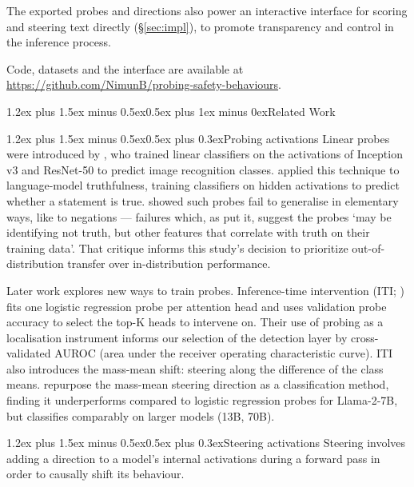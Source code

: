 \documentclass[conference]{IEEEtran}
\makeatletter
\renewcommand{\section}{\@startsection{section}{1}{\z@}%
  {1.2ex plus 1.5ex minus 0.5ex}{0.5ex plus 1ex minus 0ex}{\normalfont\normalsize\centering\scshape}}
\renewcommand{\paragraph}{\@startsection{paragraph}{4}{2em}%
  {1.2ex plus 1.5ex minus 0.5ex}{0.5ex plus 0.3ex}{\normalfont\normalsize\itshape}}
\makeatother
\begin{document}
The exported probes and directions also power an interactive interface for
scoring and steering text directly (\S\ref{sec:impl}), to promote transparency and 
control in the inference process.

Code, datasets and
the interface are available at
\url{https://github.com/NimunB/probing-safety-behaviours}.

\section{Related Work}
\label{sec:related}

\paragraph{Probing activations}
Linear probes were introduced by \citet{alain2018}, who trained linear
classifiers on the activations of Inception v3 and ResNet-50 to predict
image recognition classes. 
\citet{azaria2023} applied this technique to language-model
truthfulness, training classifiers on hidden activations to predict whether a
statement is true. \citet{levinstein2024} showed such probes fail to
generalise in elementary ways, like to negations --- failures which,
as \citet[§1]{marks2024} put it, suggest the probes `may be identifying not truth,
but other features that correlate with truth on their training data'. That
critique informs this study's decision to prioritize out-of-distribution transfer over in-distribution
performance.

Later work explores new ways to train probes. Inference-time intervention (ITI;
\citealt{li2023}) fits one logistic regression probe per attention head and uses validation
probe accuracy to select the top-K heads to intervene on. Their use of probing
as a localisation instrument informs our selection of the detection layer by
cross-validated AUROC (area under the
receiver operating characteristic curve). ITI also introduces the mass-mean shift: steering along the
difference of the class means. \citet{marks2024} repurpose the mass-mean steering direction as a classification
method, finding it underperforms compared to logistic regression probes for Llama-2-7B,
but classifies comparably on larger models (13B, 70B).

\paragraph{Steering activations}
Steering involves adding a direction to a model's internal activations during a
forward pass in order to causally shift its behaviour.
\end{document}
